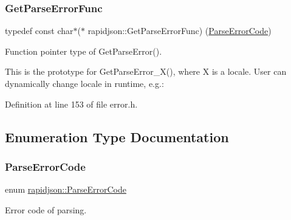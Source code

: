 \subsubsection{\texorpdfstring{GetParseErrorFunc}{GetParseErrorFunc}}
{\footnotesize\ttfamily typedef const char$\ast$($\ast$ rapidjson\+::\+Get\+Parse\+Error\+Func) (\mbox{\hyperlink{group___r_a_p_i_d_j_s_o_n___e_r_r_o_r_s_ga7d3acf640886b1f2552dc8c4cd6dea60}{Parse\+Error\+Code}})}



Function pointer type of Get\+Parse\+Error(). 

This is the prototype for {\ttfamily Get\+Parse\+Error\+\_\+\+X()}, where {\ttfamily X} is a locale. User can dynamically change locale in runtime, e.\+g.\+: 
\begin{DoxyCode}{0}
\end{DoxyCode}
 

Definition at line 153 of file error.\+h.



\subsection{Enumeration Type Documentation}
\mbox{\label{group___r_a_p_i_d_j_s_o_n___e_r_r_o_r_s_ga7d3acf640886b1f2552dc8c4cd6dea60}} 
\subsubsection{\texorpdfstring{ParseErrorCode}{ParseErrorCode}}
{\footnotesize\ttfamily enum \mbox{\hyperlink{group___r_a_p_i_d_j_s_o_n___e_r_r_o_r_s_ga7d3acf640886b1f2552dc8c4cd6dea60}{rapidjson\+::\+Parse\+Error\+Code}}}



Error code of parsing. 

